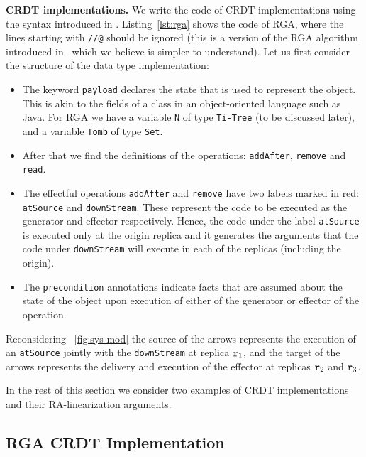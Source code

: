 \noindent
{\bf CRDT implementations.}
We write the code of CRDT implementations using the syntax introduced in \citet{ShapiroPBZ11}.
%
Listing~\ref{lst:rga} shows the code of RGA, 
where the lines starting with \lstinline|//@| should be ignored 
(this is a version of the RGA algorithm introduced in~\cite{AttiyaBGMYZ16}
which we believe is simpler to understand).
%
Let us first consider the structure of the data type implementation:
\begin{itemize}
\item The keyword \lstinline|payload| declares the state that is
  used to represent the object. This is akin to the fields of a class
  in an object-oriented language such as Java. For RGA we have a
  variable \lstinline|N| of type \lstinline|Ti-Tree| (to be discussed
  later), and a variable \lstinline|Tomb| of type \lstinline|Set|.
\item After that we find the definitions of the operations: \lstinline|addAfter|,
  \lstinline|remove| and \lstinline|read|.
\item The effectful operations \lstinline|addAfter| and
  \lstinline|remove| have two labels marked in red:
  \lstinline|atSource| and \lstinline|downStream|.
  These represent the code to be executed as the generator and
  effector respectively. Hence, the code under the label
  \lstinline|atSource| is executed only at the origin replica and it
  generates the arguments that the code under \lstinline|downStream|
  will execute in each of the replicas (including the origin).
\item The 
  \lstinline|precondition| annotations indicate facts that are
  assumed about the state of the object upon execution of either of
  the generator or effector of the operation.
\end{itemize}
Reconsidering \figureautorefname~\ref{fig:sys-mod} the
source of the arrows represents the execution of an
\lstinline|atSource| jointly with the \lstinline|downStream| at
replica $\mathtt{r}_1$, and the target of the arrows represents the
delivery and execution of the effector at replicas $\mathtt{r}_2$ and
$\mathtt{r}_3$.


In the rest of this section we consider two examples of CRDT
implementations and their RA-linearization arguments.

\subsection{RGA CRDT Implementation}
\label{sec:rga-crdt-impl}

